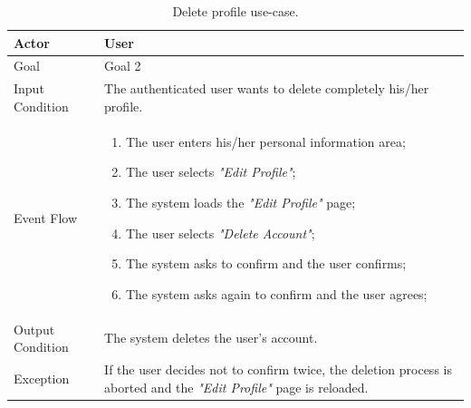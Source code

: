 \begin{table}[H]
\begin{center}
\begin{tabular}{p{} | p{}}
\hline
Actor & User\\
\hline
Goal & Goal 2\\
\hline
Input Condition & The authenticated user wants to delete completely his/her profile.\\
\hline
Event Flow & 
\begin{enumerate}
\item The user enters his/her personal information area;
\item The user selects \emph{"Edit Profile"};
\item The system loads the \emph{"Edit Profile"} page;
\item The user selects \emph{"Delete Account"};
\item The system asks to confirm and the user confirms;
\item The system asks again to confirm and the user agrees;
\end{enumerate} \\
\hline
Output Condition & The system deletes the user's account.\\
\hline
Exception & If the user decides not to confirm twice, the deletion process is aborted and the \emph{"Edit Profile"} page is reloaded.\\
\hline
\end{tabular}
\end{center}
\caption{Delete profile use-case.}
\label{delete_profile_uc}
\end{table}